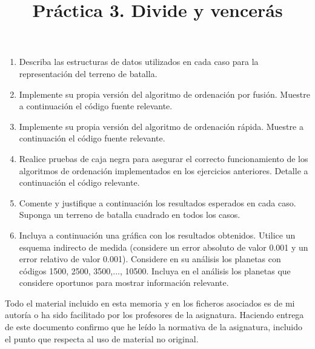\documentclass[]{article}
\title{Práctica 3. Divide y vencerás}
\author{}
\begin{document}
\maketitle


%

\begin{enumerate}
\item Describa las estructuras de datos utilizados en cada caso para la representación del terreno de batalla. 



\item Implemente su propia versión del algoritmo de ordenación por fusión. Muestre a continuación el código fuente relevante. 




\item Implemente su propia versión del algoritmo de ordenación rápida. Muestre a continuación el código fuente relevante. 



\item Realice pruebas de caja negra para asegurar el correcto funcionamiento de los algoritmos de ordenación implementados en los ejercicios anteriores. Detalle a continuación el código relevante.



\item Comente y justifique a continuación los resultados esperados en cada caso. Suponga un terreno de batalla cuadrado en todos los casos. 



\item Incluya a continuación una gráfica con los resultados obtenidos. Utilice un esquema indirecto de medida (considere un error absoluto de valor 0.001 y un error relativo de valor 0.001). Considere en su análisis los planetas con códigos 1500, 2500, 3500,..., 10500. Incluya en el análisis los planetas que considere oportunos para mostrar información relevante.



\end{enumerate}

Todo el material incluido en esta memoria y en los ficheros asociados es de mi autoría o ha sido facilitado por los profesores de la asignatura. Haciendo entrega de este documento confirmo que he leído la normativa de la asignatura, incluido el punto que respecta al uso de material no original.
\end{document}
